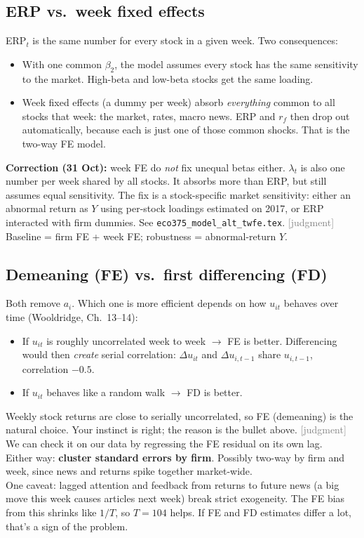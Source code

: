 \documentclass[11pt]{article}
\newcommand{\judg}{\textcolor{Gray}{\textsf{[judgment]}}}
\newcommand{\var}[1]{\texttt{#1}}
\begin{document}
\subsection{ERP vs.\ week fixed effects}
ERP$_t$ is the same number for every stock in a given week. Two consequences:
\begin{itemize}
  \item With one common $\beta_2$, the model assumes every stock has the same sensitivity to the market. High-beta and low-beta stocks get the same loading.
  \item Week fixed effects (a dummy per week) absorb \emph{everything} common to all stocks that week: the market, rates, macro news. ERP and $r_f$ then drop out automatically, because each is just one of those common shocks. That is the two-way FE model.
\end{itemize}
\textbf{Correction (31 Oct):} week FE do \emph{not} fix unequal betas either. $\lambda_t$ is also one number per week shared by all stocks. It absorbs more than ERP, but still assumes equal sensitivity. The fix is a stock-specific market sensitivity: either an abnormal return as $Y$ using per-stock loadings estimated on 2017, or ERP interacted with firm dummies. See \var{eco375\_model\_alt\_twfe.tex}. \judg{} Baseline = firm FE + week FE; robustness = abnormal-return $Y$.

\subsection{Demeaning (FE) vs.\ first differencing (FD)}\label{sec:fe}
Both remove $a_i$. Which one is more efficient depends on how $u_{it}$ behaves over time (Wooldridge, Ch.~13--14):
\begin{itemize}
  \item If $u_{it}$ is roughly uncorrelated week to week $\rightarrow$ FE is better. Differencing would then \emph{create} serial correlation: $\Delta u_{it}$ and $\Delta u_{i,t-1}$ share $u_{i,t-1}$, correlation $-0.5$.
  \item If $u_{it}$ behaves like a random walk $\rightarrow$ FD is better.
\end{itemize}
Weekly stock returns are close to serially uncorrelated, so FE (demeaning) is the natural choice. Your instinct is right; the reason is the bullet above. \judg{} We can check it on our data by regressing the FE residual on its own lag.\\
Either way: \textbf{cluster standard errors by firm}. Possibly two-way by firm and week, since news and returns spike together market-wide.\\
One caveat: lagged attention and feedback from returns to future news (a big move this week causes articles next week) break strict exogeneity. The FE bias from this shrinks like $1/T$, so $T=104$ helps. If FE and FD estimates differ a lot, that's a sign of the problem.
\end{document}
